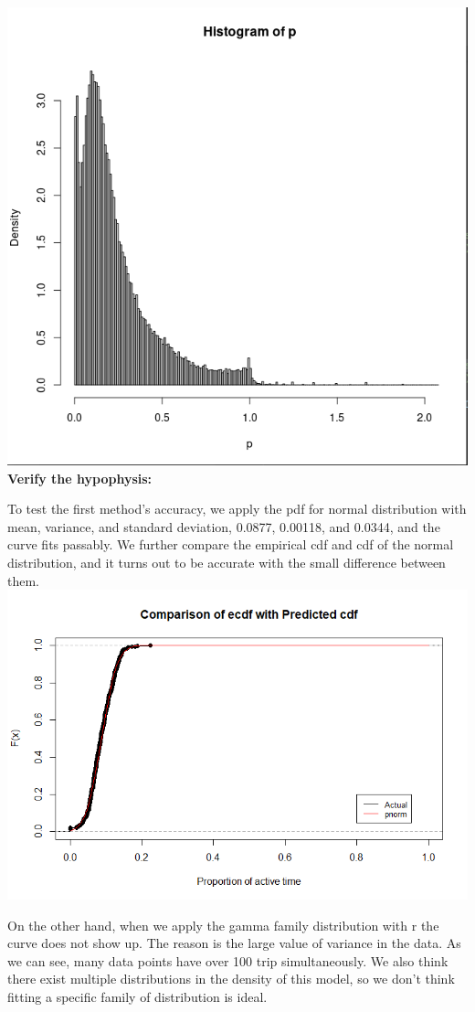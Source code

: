 \documentclass[11pt]{article}
\begin{document}
\noindent\includegraphics{hist_p2_m2.png}\\

\noindent\textbf{Verify the hypophysis:}\\
\par
To test the first method's accuracy, we apply the pdf for normal distribution with mean, variance, and standard deviation,
0.0877, 0.00118, and 0.0344, and the curve fits passably. We further compare the empirical cdf and cdf of the normal distribution,
and it turns out to be accurate with the small difference between them. \\

\noindent\includegraphics{Busy_time_cdf.png}\\
\par
On the other hand, when we apply the gamma family distribution with r  the curve does not show up. The reason is the large value of variance
in the data. As we can see, many data points have over 100%
trip simultaneously. We also think there exist multiple distributions in the density of this model, so we don’t think fitting a specific family
of distribution is ideal. \\
\end{document}
